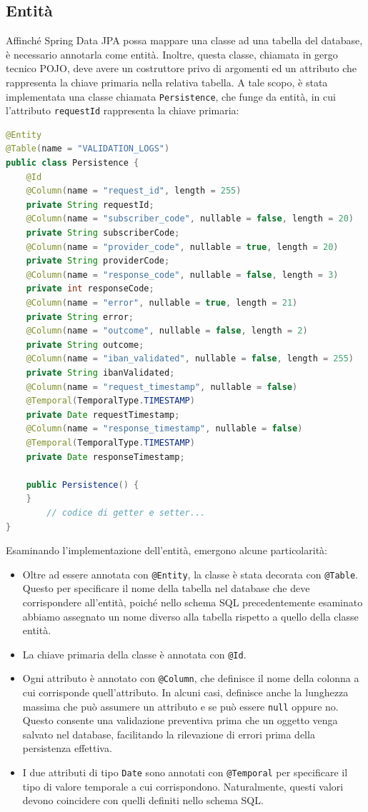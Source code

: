 \subsection{Entità}
Affinché Spring Data JPA possa mappare una classe ad una tabella del database, è necessario annotarla come entità. Inoltre, questa classe, chiamata in gergo tecnico POJO, deve avere un costruttore privo di argomenti ed un attributo che rappresenta la chiave primaria nella relativa tabella. A tale scopo, è stata implementata una classe chiamata \texttt{Persistence}, che funge da entità, in cui l’attributo \texttt{requestId} rappresenta la chiave primaria:
\begin{lstlisting}[language=Java, caption=Implementazione della classe entità.]
@Entity
@Table(name = "VALIDATION_LOGS")
public class Persistence {
    @Id
    @Column(name = "request_id", length = 255)
    private String requestId;
    @Column(name = "subscriber_code", nullable = false, length = 20)
    private String subscriberCode;
    @Column(name = "provider_code", nullable = true, length = 20)
    private String providerCode;
    @Column(name = "response_code", nullable = false, length = 3)
    private int responseCode;
    @Column(name = "error", nullable = true, length = 21)
    private String error;
    @Column(name = "outcome", nullable = false, length = 2)
    private String outcome;
    @Column(name = "iban_validated", nullable = false, length = 255)
    private String ibanValidated;
    @Column(name = "request_timestamp", nullable = false)
    @Temporal(TemporalType.TIMESTAMP)
    private Date requestTimestamp;
    @Column(name = "response_timestamp", nullable = false)
    @Temporal(TemporalType.TIMESTAMP)
    private Date responseTimestamp;

    public Persistence() {
    }
		// codice di getter e setter...
}
\end{lstlisting}
Esaminando l’implementazione dell’entità, emergono alcune particolarità:
\begin{itemize}
    \item Oltre ad essere annotata con \texttt{@Entity}, la classe è stata decorata con \texttt{@Table}. Questo per specificare il nome della tabella nel database che deve corrispondere all’entità, poiché nello schema SQL precedentemente esaminato abbiamo assegnato un nome diverso alla tabella rispetto a quello della classe entità.
    \item La chiave primaria della classe è annotata con \texttt{@Id}.
    \item Ogni attributo è annotato con \texttt{@Column}, che definisce il nome della colonna a cui corrisponde quell’attributo. In alcuni casi, definisce anche la lunghezza massima che può assumere un attributo e se può essere \texttt{null} oppure no. Questo consente una validazione preventiva prima che un oggetto venga salvato nel database, facilitando la rilevazione di errori prima della persistenza effettiva.
    \item I due attributi di tipo \texttt{Date} sono annotati con \texttt{@Temporal} per specificare il tipo di valore temporale a cui corrispondono. Naturalmente, questi valori devono coincidere con quelli definiti nello schema SQL.
\end{itemize}

